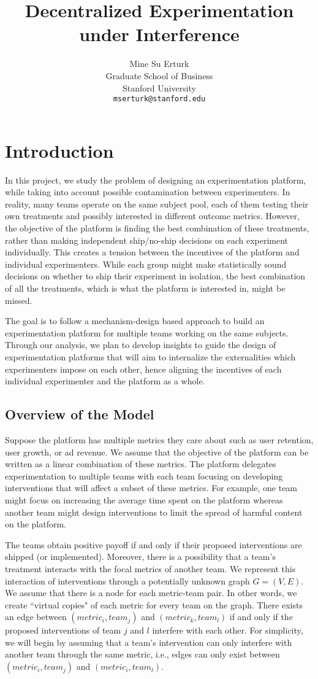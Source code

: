 \documentclass[11pt,a4paper]{article}
\title{ Decentralized Experimentation under Interference }
\author{
Mine Su Erturk\\
Graduate School of Business\\
Stanford University\\
   \texttt{mserturk@stanford.edu} 
\iffalse  
  \and
Eray Turkel\\
Graduate School of Business\\
Stanford University\\
   \texttt{eturkel@stanford.edu} 
   \fi
}
\date{}
\begin{document}
\maketitle

\section{Introduction}
In this project, we study the problem of designing an experimentation platform, while taking into account possible contamination between experimenters. In reality, many teams operate on the same subject pool, each of them testing their own treatments and possibly interested in different outcome metrics. However, the objective of the platform is finding the best combination of these treatments, rather than making independent ship/no-ship decisions on each experiment individually. This creates a tension between the incentives of the platform and individual experimenters. While each group might make statistically sound decisions on whether to ship their experiment in isolation, the best combination of all the treatments, which is what the platform is interested in, might be missed.

The goal is to follow a mechanism-design based approach to build an experimentation platform for multiple teams working on the same subjects. Through our analysis, we plan to develop insights to guide the design of experimentation platforms that will aim to internalize the externalities which experimenters impose on each other, hence aligning the incentives of each individual experimenter and the platform as a whole.

\subsection{Overview of the Model}

Suppose the platform has multiple metrics they care about such as user retention, user growth, or ad revenue. We assume that the objective of the platform can be written as a linear combination of these metrics. The platform delegates experimentation to multiple teams with each team focusing on developing interventions that will affect a subset of these metrics. For example, one team might focus on increasing the average time spent on the platform whereas another team might design interventions to limit the spread of harmful content on the platform. 

The teams obtain positive payoff if and only if their proposed interventions are shipped (or implemented). Moreover, there is a possibility that a team's treatment interacts with the focal metrics of another team. We represent this interaction of interventions through a potentially unknown graph $G=(V,E)$. We assume that there is a node for each metric-team pair. In other words, we create ``virtual copies" of each metric for every team on the graph. There exists an edge between $(metric_i, team_j)$ and $(metric_k, team_l)$ if and only if the proposed interventions of team $j$ and $l$ interfere with each other. For simplicity, we will begin by assuming that a team's intervention can only interfere with another team through the same metric, i.e., edges can only exist between $(metric_i, team_j)$ and $(metric_i, team_l)$. 
\end{document}

